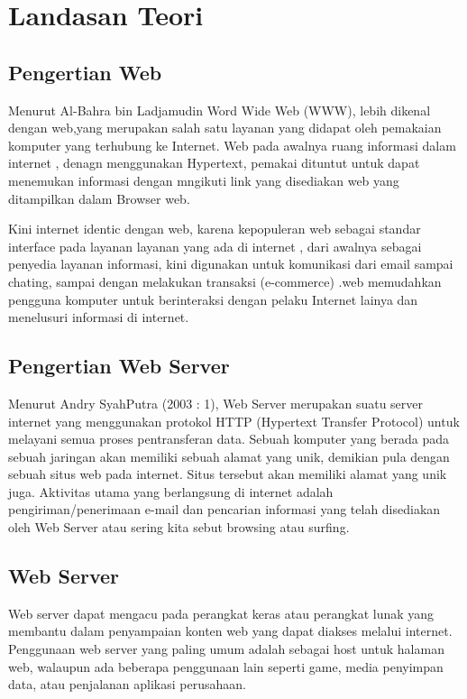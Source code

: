 \documentclass{jtetiproposalskripsi}
\begin{document}
\section{Landasan Teori}
\subsection{Pengertian Web}
Menurut Al-Bahra bin Ladjamudin Word Wide Web (WWW), lebih dikenal dengan web,yang merupakan salah satu layanan yang didapat oleh pemakaian komputer yang terhubung ke Internet. Web pada awalnya ruang informasi dalam internet , denagn menggunakan Hypertext, pemakai dituntut untuk dapat menemukan informasi dengan mngikuti link yang disediakan web yang ditampilkan dalam Browser web.

Kini internet identic dengan web, karena kepopuleran web sebagai standar interface pada layanan  layanan yang ada di internet , dari awalnya sebagai penyedia layanan informasi, kini digunakan untuk komunikasi dari email sampai chating, sampai dengan melakukan transaksi (e-commerce) .web memudahkan pengguna komputer untuk berinteraksi dengan pelaku Internet lainya dan menelusuri informasi di internet.

\subsection{Pengertian Web Server}
Menurut Andry SyahPutra (2003 : 1), Web Server merupakan suatu 
server internet yang menggunakan protokol HTTP (Hypertext Transfer Protocol) 
untuk melayani semua proses pentransferan data.  
Sebuah komputer yang berada pada sebuah jaringan akan memiliki 
sebuah alamat yang unik, demikian pula dengan sebuah situs web pada internet. 
Situs tersebut akan memiliki alamat yang unik juga. Aktivitas utama yang 
berlangsung di internet adalah pengiriman/penerimaan e-mail dan pencarian 
informasi yang telah disediakan oleh Web Server atau sering kita sebut browsing 
atau surfing.

\subsection{Web Server}
Web server dapat mengacu pada perangkat keras atau perangkat lunak yang membantu dalam penyampaian konten web yang dapat diakses melalui internet.
Penggunaan web server yang paling umum adalah sebagai host untuk halaman web, walaupun ada beberapa penggunaan lain seperti game, media penyimpan data, atau penjalanan aplikasi perusahaan.
\end{document}
